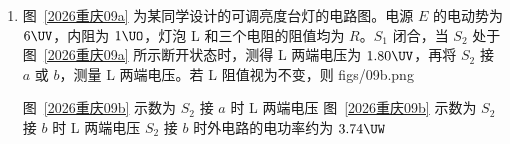 \documentclass[\gkver]{gaokaozhenti}
\begin{document}
\begin{enumerate}
{代入地球质量可得 $a=\frac{R^{2}}{r^{2}}g$

由于 $R<r$，则有 $a<g$，故 B 错误；

C．由万有引力提供向心力有 $\frac{GMm'}{r^{2}}=m'\frac{4\pi^{2}}{T^{2}}r$ 解得 $T=\sqrt{\frac{4\pi^{2}r^{3}}{GM}}$

代入地球质量可得 $T=2\pi\sqrt{\frac{r^{3}}{gR^{2}}}$，故 C 正确；

D．由万有引力提供向心力有 $\frac{GMm'}{r^{2}}=m'\frac{v^{2}}{r}$ 解得 $v=\sqrt{\frac{GM}{r}}$

代入地球质量可得 $v=\sqrt{\frac{gR^{2}}{r}}$，故 D 正确；

故选 CD。
}
\item
图~\ref{2026重庆09a} 为某同学设计的可调亮度台灯的电路图。电源 $E$ 的电动势为 $6 \UV$，内阻为 $1 \UO$，灯泡 L 和三个电阻的阻值均为 $R$。$S_{1}$ 闭合，当 $S_{2}$ 处于图~\ref{2026重庆09a} 所示断开状态时，测得 L 两端电压为 $1.80 \UV$，再将 $S_{2}$ 接 $a$ 或 $b$，测量 L 两端电压。若 L 阻值视为不变，则 
{figs/09b.png}

{图~\ref{2026重庆09b} 示数为 $S_{2}$ 接 $a$ 时 L 两端电压}
{图~\ref{2026重庆09b} 示数为 $S_{2}$ 接 $b$ 时 L 两端电压}
{$S_{2}$ 接 $b$ 时外电路的电功率约为 $3.74 \UW$}


\end{enumerate}
\end{document}
